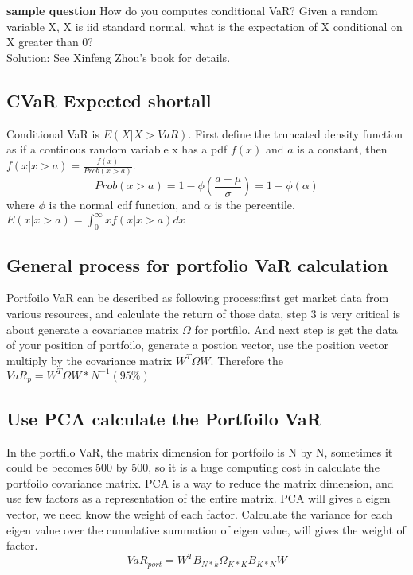 \documentclass[a4paper,11pt]{article}
\begin{document}
{\bf sample question}
How do you computes conditional VaR? Given a random variable X, X is iid standard normal, what is the expectation of X conditional on X greater than 0?\\
Solution: See Xinfeng Zhou's book for details.\\
\subsection{CVaR Expected shortall}
Conditional VaR is $E(X|X>VaR)$. First define the truncated density function as if a continous random variable x has a pdf $f(x)$ and $a$ is a constant, then $f(x|x>a)=\frac{f(x)}{Prob(x>a)}$. \\
$$
Prob(x>a)=1-\phi(\frac{a-\mu}{\sigma})=1-\phi(\alpha)
$$
where $\phi$ is the normal cdf function, and $\alpha$ is the percentile. \\
$E(x|x>a)=\int_0^{\infty} xf(x|x>a) dx$
\subsection{General process for portfolio VaR calculation}
Portfoilo VaR can be described as following process:first get market data from various resources, and calculate the return of those data, step 3 is very critical is about generate a covariance matrix $\Omega$ for portfilo. And next step is get the data of your position of portfoilo, generate a postion vector, use the position vector multiply by the covariance matrix $W^T\Omega W$. Therefore the $VaR_p=W^T\Omega W*N^{-1}(95 \%)$
\subsection{Use PCA calculate the Portfoilo VaR}
In the portfilo VaR, the matrix dimension for portfoilo is N by N, sometimes it could be becomes 500 by 500, so it is a huge computing cost in calculate the portfoilo covariance matrix. PCA is a way to reduce the matrix dimension, and use few factors as a representation of the entire matrix. PCA will gives a eigen vector, we need know the weight of each factor. Calculate the variance for each eigen value over the cumulative summation of eigen value, will gives the weight of factor.
$$ VaR_{port}=W^T B_{N*k}  \Omega_{K*K}  B_{K*N}  W $$\\
\end{document}
